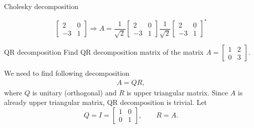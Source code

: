 \begin{problem}{Cholesky decomposition}
\begin{solution}
$$            \begin{bmatrix}
                 2 & 0\\
                -3 & 1
            \end{bmatrix}
            \Longrightarrow
            A=\dfrac{1}{\sqrt{2}}
            \begin{bmatrix}
                 2 & 0\\
                -3 & 1
            \end{bmatrix}
            \dfrac{1}{\sqrt{2}}
            \begin{bmatrix}
                 2 & 0\\
                -3 & 1
            \end{bmatrix}^*
        $$      
\end{solution}
\end{problem}
\begin{problem}{QR decomposition}
    Find QR decomposition matrix of the matrix 
    $A = \begin{bmatrix}
            1 & 2 \\
            0 & 3
        \end{bmatrix}$.
\begin{solution}
    We need to find following decomposition
    \begin{eqnarray}      
        A=QR,\nonumber
    \end{eqnarray}
    where $Q$ is unitary (orthogonal) and $R$ is upper triangular matrix. Since $A$ is already upper triangular matrix, QR decomposition is trivial. Let
    $$
        Q=I=
        \begin{bmatrix}
            1 & 0\\
            0 & 1
        \end{bmatrix},\qquad 
        R=A.
    $$
\end{solution}
\end{problem}
